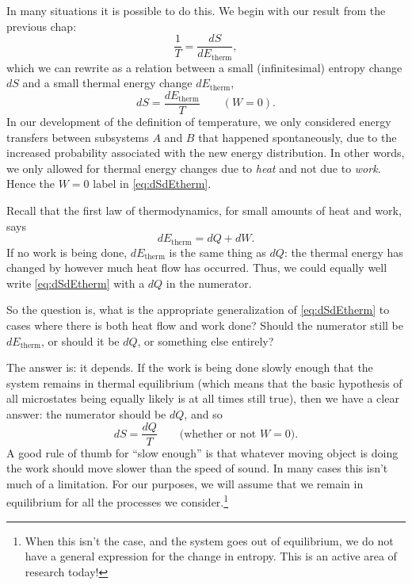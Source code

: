 In many situations it is possible to do this.  We begin with our
result from the previous chap:
\begin{equation}
\frac{1}{T} = \frac{dS}{dE_\text{therm}},
\end{equation}
which we can rewrite as a relation between a small (infinitesimal) entropy
change $dS$ and a small thermal energy change $dE_\text{therm}$,
\begin{equation}
dS = \frac{dE_\text{therm}}{T} \qquad(W=0).
\label{eq:dSdEtherm}
\end{equation}
In our development of the definition of temperature, we only
considered energy transfers between subsystems $A$ and $B$ that
happened spontaneously, due to the increased probability associated
with the new energy distribution.  In other words, we only allowed for
thermal energy changes due to \textit{heat} and not due to \textit{work}.
Hence the $W=0$ label in \eqref{eq:dSdEtherm}.

Recall that the first law of thermodynamics, for small amounts of heat
and work, says
\begin{equation}
dE_\text{therm} = dQ + dW.
\end{equation}
If no work is being done, $dE_\text{therm}$ is the same thing as $dQ$:
the thermal energy has changed by however much heat flow has occurred.
Thus, we could equally well write \eqref{eq:dSdEtherm} with a $dQ$
in the numerator.

So the question is, what is the appropriate generalization of
\eqref{eq:dSdEtherm} to cases where there is both heat flow and
work done?  Should the numerator still be $dE_\text{therm}$, or should
it be $dQ$, or something else entirely?

The answer is: it depends.  If the work is being done slowly enough
that the system remains in thermal equilibrium (which means that the
basic hypothesis of all microstates being equally likely is at all
times still true), then we have a clear answer: the numerator should
be $dQ$, and so
\begin{equation}
dS = \frac{dQ}{T}  \qquad\text{(whether or not $W=0$)}.
\label{eq:dSdQ}
\end{equation}
A good rule of thumb for ``slow enough'' is that whatever moving
object is doing the work should move slower than the speed of sound.
In many cases this isn't much of a limitation.  For our purposes, we
will assume that we remain in equilibrium for all the processes we
consider.\footnote{When this isn't the case, and the system goes out
  of equilibrium, we do not have a general expression for the change
  in entropy.  This is an active area of research today!}

